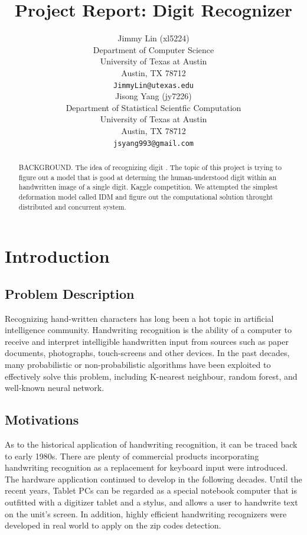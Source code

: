 \documentclass{article} %
\title{Project Report: Digit Recognizer}
\author{
Jimmy Lin (xl5224) \\
Department of Computer Science\\
University of Texas at Austin\\
Austin, TX 78712 \\
\texttt{JimmyLin@utexas.edu} \\
\And
Jisong Yang (jy7226) \\
Department of Statistical Scientfic Computation\\
University of Texas at Austin\\
Austin, TX 78712 \\
\texttt{jsyang993@gmail.com} \\
}
\begin{document}
\maketitle

\begin{abstract}
    BACKGROUND. The idea of recognizing digit . 
    The topic of this project is trying to figure out a model that is good at
    determing the human-understood digit within an handwritten image of a
    single digit. Kaggle competition. 
    We attempted the simplest deformation model called IDM and figure out the
    computational solution throught distributed and concurrent system.

\end{abstract}

\section{Introduction}
\subsection{Problem Description}
Recognizing hand-written characters has long been a hot topic in artificial
intelligence community. 
Handwriting recognition is the ability of a computer to receive and
interpret intelligible handwritten input from sources such as paper documents,
photographs, touch-screens and other devices.
In the past decades, many probabilistic or non-probabilistic algorithms have
been exploited to effectively solve this problem, including K-nearest
neighbour, random forest, and well-known neural network. 


 \subsection{Motivations} \label{Motivation}
As to the historical application of handwriting recognition, 
it can be traced back to early 1980s.  There are plenty of commercial products
incorporating handwriting recognition as a replacement for keyboard input were
introduced. The hardware application continued to develop
in the following decades.  Until the recent years, Tablet PCs can be regarded
as a special notebook computer that is outfitted with a digitizer tablet and a
stylus, and allows a user to handwrite text on the unit's screen. In addition,
highly efficient handwriting recognizers were developed in real world to apply
on the zip codes detection.
\end{document}
